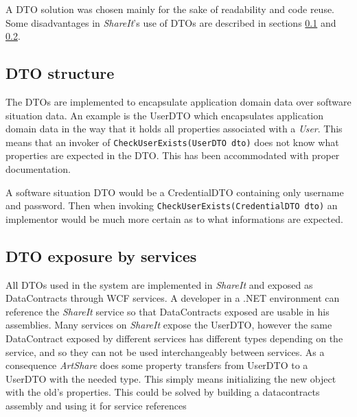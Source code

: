 \documentclass[../report.tex]{subfiles}
\begin{document}
A DTO solution was chosen mainly for the sake of readability and code reuse. Some disadvantages in \textit{ShareIt}'s use of DTOs are described in sections \ref{sec:dtoStructure} and \ref{sec:dtoExposition}.

\subsection{DTO structure}
\label{sec:dtoStructure}

The DTOs are implemented to encapsulate application domain data over software situation data. An example is the UserDTO which encapsulates application domain data in the way that it holds all properties associated with a \textit{User}. This means that an invoker of \texttt{CheckUserExists(UserDTO dto)} does not know what properties are expected in the DTO. This has been accommodated with proper documentation.

A software situation DTO would be a CredentialDTO containing only username and password. Then when invoking \texttt{CheckUserExists(CredentialDTO dto)} an implementor would be much more certain as to what informations are expected.






\subsection{DTO exposure by services}
\label{sec:dtoExposition}

All DTOs used in the system are implemented in \textit{ShareIt} and exposed as DataContracts through WCF services. A developer in a .NET environment can reference the \textit{ShareIt} service so that DataContracts exposed are usable in his assemblies. Many services on \textit{ShareIt} expose the UserDTO, however the same DataContract exposed by different services has different types depending on the service, and so they can not be used interchangeably between services. As a consequence \textit{ArtShare} does some property transfers from UserDTO to a UserDTO with the needed type. This simply means initializing the new object with the old's properties. This could be solved by building a datacontracts assembly and using it for service references \cite{freddes2010}
\end{document}
